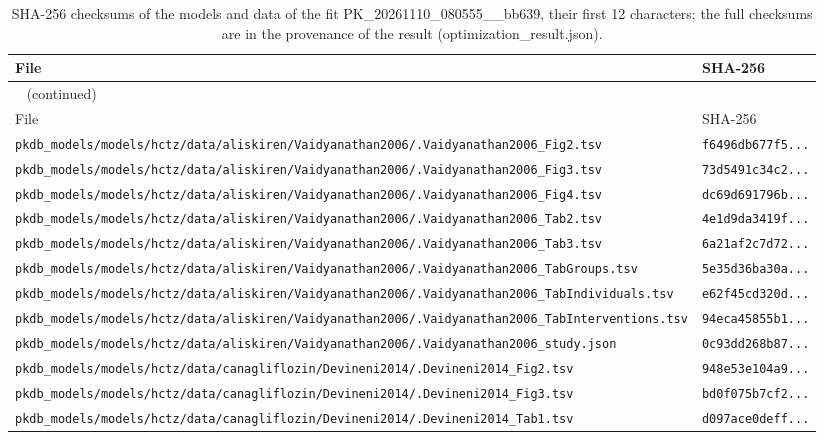 \begin{longtable}{ll}
\caption{SHA-256 checksums of the models and data of the fit PK\_20261110\_080555\_\_bb639, their first 12 characters; the full checksums are in the provenance of the result (optimization\_result.json).}\label{tab:checksums:PK_20261110_080555__bb639} \\
\toprule
File & SHA-256 \\
\midrule
\endfirsthead
\multicolumn{2}{l}{\small\tablename~\thetable{} (continued)} \\
\toprule
File & SHA-256 \\
\midrule
\endhead
\bottomrule
\endlastfoot
\texttt{pkdb\_models/models/hctz/data/aliskiren/Vaidyanathan2006/.Vaidyanathan2006\_Fig2.tsv} & \texttt{f6496db677f5...} \\
\texttt{pkdb\_models/models/hctz/data/aliskiren/Vaidyanathan2006/.Vaidyanathan2006\_Fig3.tsv} & \texttt{73d5491c34c2...} \\
\texttt{pkdb\_models/models/hctz/data/aliskiren/Vaidyanathan2006/.Vaidyanathan2006\_Fig4.tsv} & \texttt{dc69d691796b...} \\
\texttt{pkdb\_models/models/hctz/data/aliskiren/Vaidyanathan2006/.Vaidyanathan2006\_Tab2.tsv} & \texttt{4e1d9da3419f...} \\
\texttt{pkdb\_models/models/hctz/data/aliskiren/Vaidyanathan2006/.Vaidyanathan2006\_Tab3.tsv} & \texttt{6a21af2c7d72...} \\
\texttt{pkdb\_models/models/hctz/data/aliskiren/Vaidyanathan2006/.Vaidyanathan2006\_TabGroups.tsv} & \texttt{5e35d36ba30a...} \\
\texttt{pkdb\_models/models/hctz/data/aliskiren/Vaidyanathan2006/.Vaidyanathan2006\_TabIndividuals.tsv} & \texttt{e62f45cd320d...} \\
\texttt{pkdb\_models/models/hctz/data/aliskiren/Vaidyanathan2006/.Vaidyanathan2006\_TabInterventions.tsv} & \texttt{94eca45855b1...} \\
\texttt{pkdb\_models/models/hctz/data/aliskiren/Vaidyanathan2006/.Vaidyanathan2006\_study.json} & \texttt{0c93dd268b87...} \\
\texttt{pkdb\_models/models/hctz/data/canagliflozin/Devineni2014/.Devineni2014\_Fig2.tsv} & \texttt{948e53e104a9...} \\
\texttt{pkdb\_models/models/hctz/data/canagliflozin/Devineni2014/.Devineni2014\_Fig3.tsv} & \texttt{bd0f075b7cf2...} \\
\texttt{pkdb\_models/models/hctz/data/canagliflozin/Devineni2014/.Devineni2014\_Tab1.tsv} & \texttt{d097ace0deff...} \\

\end{longtable}
